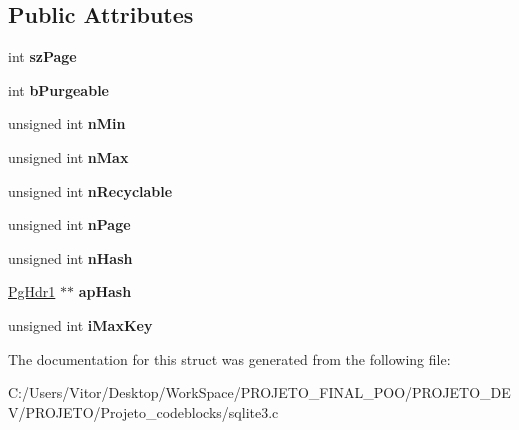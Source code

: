 \subsection*{Public Attributes}
\begin{DoxyCompactItemize}
\item 
\hypertarget{struct_p_cache1_a1425039a858b7518c097d8ae92597de0}{int {\bfseries sz\-Page}}\label{struct_p_cache1_a1425039a858b7518c097d8ae92597de0}

\item 
\hypertarget{struct_p_cache1_a2af7d24e27369252addec9bef45afcfc}{int {\bfseries b\-Purgeable}}\label{struct_p_cache1_a2af7d24e27369252addec9bef45afcfc}

\item 
\hypertarget{struct_p_cache1_a9e96c79ec60c2e368f92a2ba52d01c44}{unsigned int {\bfseries n\-Min}}\label{struct_p_cache1_a9e96c79ec60c2e368f92a2ba52d01c44}

\item 
\hypertarget{struct_p_cache1_aef08139a0b86b0c0a7ee2bec0bab2405}{unsigned int {\bfseries n\-Max}}\label{struct_p_cache1_aef08139a0b86b0c0a7ee2bec0bab2405}

\item 
\hypertarget{struct_p_cache1_a3501394bd251f08d1f9d26d3b2d4c67c}{unsigned int {\bfseries n\-Recyclable}}\label{struct_p_cache1_a3501394bd251f08d1f9d26d3b2d4c67c}

\item 
\hypertarget{struct_p_cache1_ace332c276e28352992529f60f0ac457c}{unsigned int {\bfseries n\-Page}}\label{struct_p_cache1_ace332c276e28352992529f60f0ac457c}

\item 
\hypertarget{struct_p_cache1_a09d9488a8a3a52822e33dd43e14c69e1}{unsigned int {\bfseries n\-Hash}}\label{struct_p_cache1_a09d9488a8a3a52822e33dd43e14c69e1}

\item 
\hypertarget{struct_p_cache1_a1169ec7ba2a628d89841d16ced651e1f}{\hyperlink{struct_pg_hdr1}{Pg\-Hdr1} $\ast$$\ast$ {\bfseries ap\-Hash}}\label{struct_p_cache1_a1169ec7ba2a628d89841d16ced651e1f}

\item 
\hypertarget{struct_p_cache1_a2dff616ad2d1873ad3a8d20d53bcb4d0}{unsigned int {\bfseries i\-Max\-Key}}\label{struct_p_cache1_a2dff616ad2d1873ad3a8d20d53bcb4d0}

\end{DoxyCompactItemize}


The documentation for this struct was generated from the following file\-:\begin{DoxyCompactItemize}
\item 
C\-:/\-Users/\-Vitor/\-Desktop/\-Work\-Space/\-P\-R\-O\-J\-E\-T\-O\-\_\-\-F\-I\-N\-A\-L\-\_\-\-P\-O\-O/\-P\-R\-O\-J\-E\-T\-O\-\_\-\-D\-E\-V/\-P\-R\-O\-J\-E\-T\-O/\-Projeto\-\_\-codeblocks/sqlite3.\-c\end{DoxyCompactItemize}
